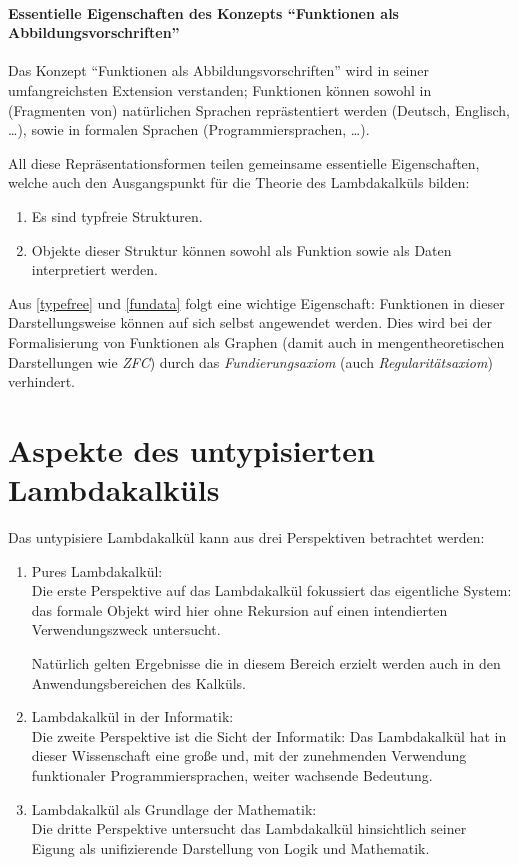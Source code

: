 \paragraph{Essentielle Eigenschaften des Konzepts 
			\enquote{Funktionen als Abbildungsvorschriften}}

Das Konzept \enquote{Funktionen als Abbildungsvorschriften} wird 
in seiner umfangreichsten Extension verstanden;
Funktionen können sowohl in (Fragmenten von) natürlichen Sprachen 
reprästentiert werden (Deutsch, Englisch, \dots),
sowie in formalen Sprachen (Programmiersprachen, \dots {}).

All diese Repräsentationsformen teilen gemeinsame essentielle Eigenschaften,
welche auch den Ausgangspunkt für die Theorie des Lambdakalküls bilden:
\begin{enumerate}
\item \label{typefree} Es sind typfreie Strukturen.
\item \label{fundata}  Objekte dieser Struktur können sowohl als Funktion 
	  sowie als Daten interpretiert werden.
\end{enumerate}

Aus \ref{typefree} und \ref{fundata} folgt eine wichtige Eigenschaft:
Funktionen in dieser Darstellungsweise können auf sich selbst angewendet werden.
Dies wird bei der Formalisierung von Funktionen als Graphen 
(damit auch in mengentheoretischen Darstellungen wie \emph{ZFC}) 
durch das \emph{Fundierungsaxiom} (auch \emph{Regularitätsaxiom})
verhindert.


\newpage
\section{Aspekte des untypisierten Lambdakalküls}

Das untypisiere Lambdakalkül kann aus drei Perspektiven betrachtet werden:
\begin{enumerate}
\item Pures Lambdakalkül:\\
	Die erste Perspektive auf das Lambdakalkül fokussiert das eigentliche System:
	das formale Objekt wird hier ohne Rekursion auf einen intendierten 
	Verwendungszweck untersucht.
	
	Natürlich gelten Ergebnisse die in diesem Bereich erzielt werden auch in den
	Anwendungsbereichen des Kalküls.
\item Lambdakalkül in der Informatik:\\
	Die zweite Perspektive ist die Sicht der Informatik:
	Das Lambdakalkül hat in dieser Wissenschaft eine große und, 
	mit der zunehmenden Verwendung funktionaler Programmiersprachen, 
	weiter wachsende Bedeutung. 
\item Lambdakalkül als Grundlage der Mathematik:\\
	Die dritte Perspektive untersucht das Lambdakalkül hinsichtlich
	seiner Eigung als unifizierende Darstellung von Logik und Mathematik.
\end{enumerate}


